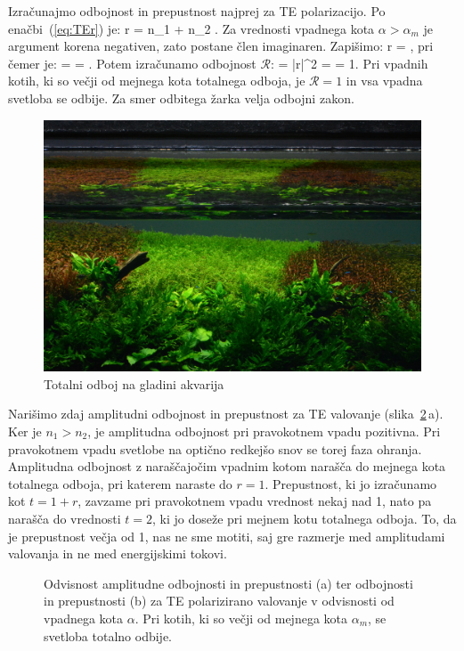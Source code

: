 Izračunajmo odbojnost in prepustnost najprej za TE polarizacijo.
Po enačbi~(\ref{eq:TEr}) je:
\beq
r = 
{n_1 \cos \alpha + n_2 }.
\label{eq:04_53}
\eeq
Za vrednosti vpadnega kota $\alpha > \alpha_m$ je argument korena
negativen, zato postane člen imaginaren. Zapišimo:
\beq
r = ,
\label{eq:04_54}
\eeq
pri čemer je:
\beq
\kappa =   = 
.
\label{eq:04_55}
\eeq
Potem izračunamo odbojnost $\mathcal{R}$:
\beq
{} = |r|^2 = 
\cdot {} = 1.
\label{eq:04_56}
\eeq
Pri vpadnih kotih, ki so večji od mejnega kota totalnega odboja, je $\mathcal{R} = 1$
in vsa vpadna svetloba se odbije. Za smer odbitega žarka velja odbojni zakon. 
\begin{figure}[ht]
\centering
\includegraphics[width=10truecm]{slike/04_TotalniOdbojFoto.jpg}
\caption{Totalni odboj na gladini akvarija}
\label{fig:04_TotalniFoto}
\end{figure}

Narišimo zdaj amplitudni odbojnost in prepustnost za TE valovanje 
(slika~\ref{fig:04_goste}\,a). 
Ker je $n_1>n_2$, je amplitudna odbojnost pri pravokotnem vpadu pozitivna. 
Pri pravokotnem vpadu svetlobe na optično redkejšo snov se torej
faza ohranja. Amplitudna odbojnost z naraščajočim vpadnim kotom narašča do mejnega kota totalnega
odboja, pri katerem naraste do $r=1$. Prepustnost, ki jo izračunamo
kot $t = 1+r$, zavzame pri pravokotnem vpadu vrednost nekaj nad 1,
nato pa narašča do vrednosti $t=2$, ki jo doseže pri mejnem kotu totalnega
odboja. To, da je prepustnost večja od 1, nas ne sme motiti, saj gre
razmerje med amplitudami valovanja in ne med energijskimi tokovi.
\begin{figure}[ht]
\centering
\def\svgwidth{140truemm} 

\caption{Odvisnost amplitudne odbojnosti in prepustnosti (a) ter odbojnosti in 
prepustnosti (b) za TE polarizirano valovanje v odvisnosti od vpadnega kota $\alpha$. 
Pri kotih, ki so večji od mejnega kota $\alpha_m$, se svetloba totalno odbije.}
\label{fig:04_goste}
\end{figure}

